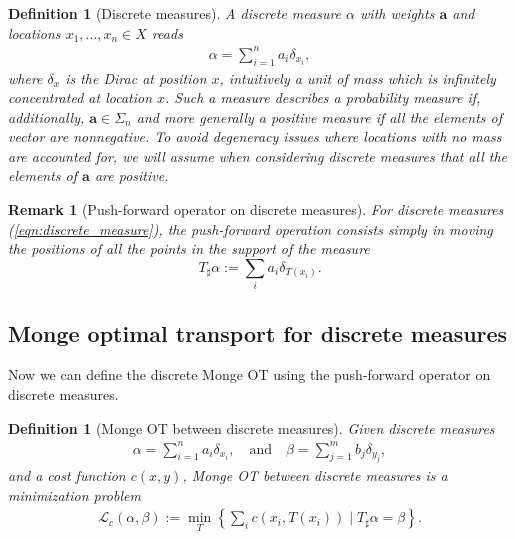 \documentclass[11pt]{book}
\newtheorem{definition}[theorem]{Definition}
\newtheorem{remark}[theorem]{Remark}
\begin{document}
\begin{definition}[Discrete measures]
A discrete measure $\alpha$ with weights $\mathbf{a}$ and locations \(x_1, \ldots, x_n \in X\) reads
\begin{align}\label{eqn:discrete_measure}
\alpha = \sum_{i=1}^n a_i \delta_{x_i},
\end{align}
where \(\delta_{x}\) is the Dirac at position \(x\), intuitively a unit of mass which is infinitely concentrated at location \(x\). Such a measure describes a probability measure if, additionally, \(\mathbf{a} \in \Sigma_n\) and more generally a positive measure if all the elements of vector are nonnegative. To avoid degeneracy issues where locations with no mass are accounted for, we will assume when considering discrete measures that all the elements of \(\mathbf{a}\) are positive.
\end{definition}


\begin{remark}[Push-forward operator on discrete measures]
For discrete measures (\ref{eqn:discrete_measure}), the push-forward operation consists simply in moving the positions of all the points in the support of the measure
\[
T_\sharp \alpha := \sum_i a_i \delta_{T(x_i)}.
\]
\end{remark}





\subsection[Discrete Monge]{Monge optimal transport for discrete measures}




Now we can define the discrete Monge OT using the push-forward operator on discrete measures. 

\begin{definition}[Monge OT between discrete measures]
Given discrete measures 
\begin{align}\label{eqn:discrete_measure02}
\alpha = \sum_{i=1}^n a_i \delta_{x_i}, \quad \text{and} \quad \beta = \sum_{j=1}^m b_j \delta_{y_j},
\end{align}
and a cost function $c(x,y)$, Monge OT between discrete measures is a minimization problem
\begin{align}
\mathcal{L}_{c}(\alpha, \beta) := \min_T \left\{\sum_i c(x_i, T(x_i)) \mid T_\sharp \alpha = \beta \right\}.\label{eqn:Monge_discrete} 
\end{align}
\end{definition}
\end{document}
